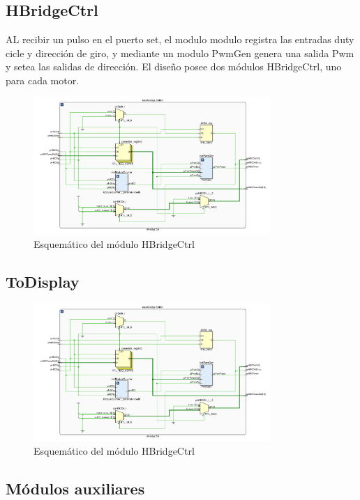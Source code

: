 \documentclass[12pt]{article}
\begin{document}
\subsection{HBridgeCtrl}
AL recibir un pulso en el puerto set, el modulo modulo registra las entradas duty cicle y dirección de giro, y mediante un modulo PwmGen genera una salida Pwm  y setea las salidas de dirección. El diseño posee dos módulos HBridgeCtrl, uno para cada motor.

\begin{figure}[H]
    \centering
    \includegraphics[width=0.8\textwidth]{hbridge-ctrl-png}
    \caption{Esquemático del módulo HBridgeCtrl}
\end{figure}


\subsection{ToDisplay}

\begin{figure}[H]
    \centering
    \includegraphics[width=0.8\textwidth]{hbridge-ctrl-png}
    \caption{Esquemático del módulo HBridgeCtrl}
\end{figure}

\subsection{Módulos auxiliares}
\end{document}
